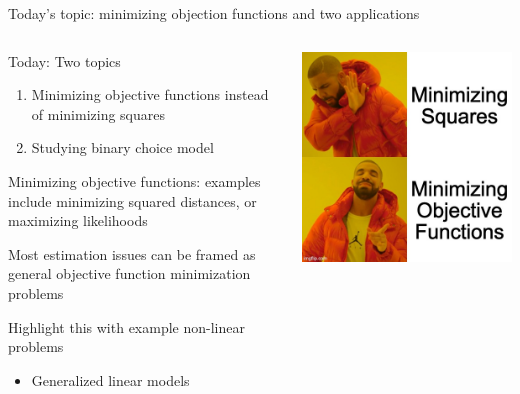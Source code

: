 \documentclass[notes,11pt, aspectratio=169]{beamer}
\newenvironment{wideitemize}{\itemize\addtolength{\itemsep}{10pt}}{\enditemize}
\begin{document}
\begin{frame}{Today's topic: minimizing objection functions and two applications }
  \begin{columns}[T] %
    \begin{column}{.6\textwidth}
      \begin{wideitemize}
      \item Today: Two topics
        \begin{enumerate}
        \item Minimizing objective functions instead of minimizing squares
        \item Studying binary choice model
        \end{enumerate}
      \item Minimizing objective functions: examples include
        minimizing squared distances, or maximizing likelihoods
      \item Most estimation issues can be framed as general
        objective function minimization problems
      \item Highlight this with example non-linear problems
        \begin{itemize}
        \item Generalized linear models 
        \end{itemize}
      \end{wideitemize}
    \end{column}%
  \hfill%
  \begin{column}{.4\textwidth}
    \includegraphics[width=\linewidth]{images/drake_minimization.jpg}
  \end{column}
\end{columns}
\end{frame}
\end{document}
